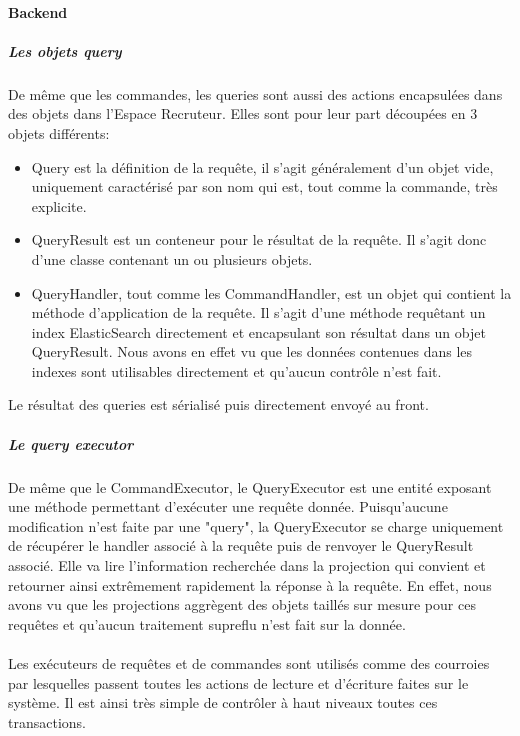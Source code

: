 \paragraph{Backend}
\label{par:Backend}
\subparagraph{Les objets query}
\label{subp:Les objets query}
De même que les commandes, les queries sont aussi des actions encapsulées dans des objets dans l'Espace Recruteur.
Elles sont pour leur part découpées en 3 objets différents:
\begin{itemize}
  \item Query est la définition de la requête, il s'agit généralement d'un objet vide, uniquement caractérisé par son nom qui est, tout comme la commande, très explicite.
  \item QueryResult est un conteneur pour le résultat de la requête.
  Il s'agit donc d'une classe contenant un ou plusieurs objets.
  \item QueryHandler, tout comme les CommandHandler, est un objet qui contient la méthode d'application de la requête.
  Il s'agit d'une méthode requêtant un index ElasticSearch directement et encapsulant son résultat dans un objet QueryResult.
  Nous avons en effet vu que les données contenues dans les indexes sont utilisables directement et qu'aucun contrôle n'est fait.
\end{itemize}
Le résultat des queries est sérialisé puis directement envoyé au front.
\subparagraph{Le query executor}
De même que le CommandExecutor, le QueryExecutor est une entité exposant une méthode permettant d'exécuter une requête donnée.
Puisqu'aucune modification n'est faite par une "query", la QueryExecutor se charge uniquement de récupérer le handler associé à la requête puis de renvoyer le QueryResult associé.
Elle va lire l'information recherchée dans la projection qui convient et retourner ainsi extrêmement rapidement la réponse à la requête.
En effet, nous avons vu que les projections aggrègent des objets taillés sur mesure pour ces requêtes et qu'aucun traitement supreflu n'est fait sur la donnée.

\paragraph{}
Les exécuteurs de requêtes et de commandes sont utilisés comme des courroies par lesquelles passent toutes les actions de lecture et d'écriture faites sur le système.
Il est ainsi très simple de contrôler à haut niveaux toutes ces transactions.

